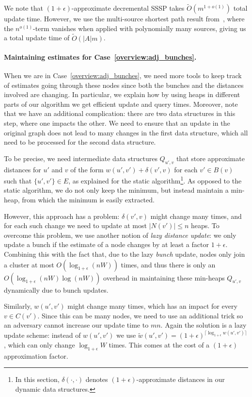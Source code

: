 We note that $(1+\epsilon)$-approximate decremental SSSP takes $\tilde O(m^{1+o(1)})$ total update time. However, we use the multi-source shortest path result from~\cite{LN2020}, where the $n^{o(1)}$-term vanishes when applied with polynomially many sources, giving us a total update time of $\tilde O(|A|m)$.
 

\paragraph{Maintaining estimates for Case~\ref{overview:adj_bunches}.}
When we are in Case~\ref{overview:adj_bunches}, we need more tools to keep track of estimates going through these nodes since both the bunches and the distances involved are changing. In particular, we explain how by using heaps in different parts of our algorithm we get efficient update and query times.
Moreover, note that we have an additional complication: there are two data structures in this step, where one impacts the other. We need to ensure that an update in the original graph does not lead to many changes in the first data structure, which all need to be processed for the second data structure. 

To be precise, we need intermediate data structures $Q_{u',v}$ that store approximate distances for $u'$ and $v$ of the form $w(u',v')+\delta(v',v)$ for each $v'\in B(v)$ such that $\{u',v'\}\in E$, as explained for the static algorithm\footnote{In this section, $\delta(\cdot,\cdot)$ denotes $(1+\epsilon)$-approximate distances in our dynamic data structures.}. As opposed to the static algorithm, we do not only keep the minimum, but instead maintain a min-heap, from which the minimum is easily extracted. 

However, this approach has a problem: $\delta(v',v)$ might change many times, and for each such change we need to update at most $|N(v')|\leq n$ heaps. To overcome this problem, we use another notion of \textit{lazy distance update}: we only update a bunch if the estimate of a node changes by at least a factor $1+\epsilon$. Combining this with the fact that, due to the lazy \textit{bunch} update, nodes only join a cluster at most $O(\log_{1+\epsilon}(nW))$ times, and thus there is only an $ O(\log_{1+\epsilon}(nW)\log(nW))$ overhead in maintaining these min-heaps $Q_{u',v}$ dynamically due to bunch updates. 

Similarly, $w(u',v')$ might change many times, which has an impact for every $v\in C(v')$. Since this can be many nodes, we need to use an additional trick so an adversary cannot increase our update time to $mn$. Again the solution is a lazy update scheme: instead of $w(u',v')$ we use $\tilde w(u', v')=(1+\epsilon)^{\lceil \log_{1+\epsilon} w(u',v')\rceil}$, which can only change $\log_{1+\epsilon} W$ times. This comes at the cost of a $(1+\epsilon)$ approximation factor. 


